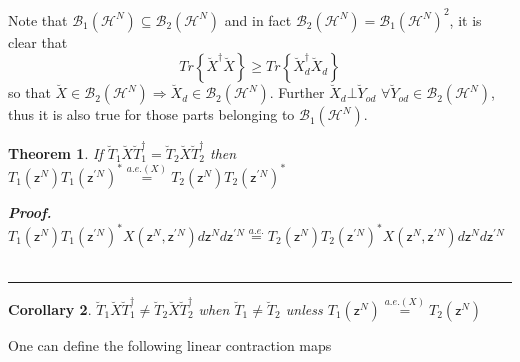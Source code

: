 \documentclass[aps,preprint]{revtex4}
\newtheorem{theorem}{Theorem}
\newtheorem{corollary}[theorem]{Corollary}
\newenvironment{proof}[1][Proof]{\noindent\textbf{#1.} }{\ \rule{0.5em}{0.5em}}
\begin{document}
Note that $\mathcal{B}_{1}\left( \mathcal{H}^{N}\right) \subseteq \mathcal{B}%
_{2}\left( \mathcal{H}^{N}\right) $ and in fact $\mathcal{B}_{2}\left( 
\mathcal{H}^{N}\right) =\mathcal{B}_{1}\left( \mathcal{H}^{N}\right) ^{2}$,
it is clear that 
\begin{equation}
Tr\left\{ \breve{X}^{\dagger }\breve{X}\right\} \geq Tr\left\{ \breve{X}%
_{d}^{\dagger }\breve{X}_{d}\right\}
\end{equation}%
so that $\breve{X}\in \mathcal{B}_{2}\left( \mathcal{H}^{N}\right)
\Rightarrow \breve{X}_{d}\in \mathcal{B}_{2}\left( \mathcal{H}^{N}\right) $.
Further $\breve{X}_{d}\bot \breve{Y}_{od}$ $\forall \breve{Y}_{od}\in 
\mathcal{B}_{2}\left( \mathcal{H}^{N}\right) $, thus it is also true for
those parts belonging to $\mathcal{B}_{1}\left( \mathcal{H}^{N}\right) $.

\begin{theorem}
If $\breve{T}_{1}\breve{X}\breve{T}_{1}^{\dagger }=\breve{T}_{2}\breve{X}%
\breve{T}_{2}^{\dagger }$ then $T_{1}\left( \mathsf{z}^{N}\right)
T_{1}\left( \mathsf{z}^{\prime N}\right) ^{\ast }\overset{a.e.\left(
X\right) }{=}T_{2}\left( \mathsf{z}^{N}\right) T_{2}\left( \mathsf{z}%
^{\prime N}\right) ^{\ast }$

\begin{proof}
$T_{1}\left( \mathsf{z}^{N}\right) T_{1}\left( \mathsf{z}^{\prime N}\right)
^{\ast }X\left( \mathsf{z}^{N},\mathsf{z}^{\prime N}\right) d\mathsf{z}^{N}d%
\mathsf{z}^{\prime N}\overset{a.e.}{=}T_{2}\left( \mathsf{z}^{N}\right)
T_{2}\left( \mathsf{z}^{\prime N}\right) ^{\ast }X\left( \mathsf{z}^{N},%
\mathsf{z}^{\prime N}\right) d\mathsf{z}^{N}d\mathsf{z}^{\prime N}$
\end{proof}
\end{theorem}

\begin{corollary}
$\breve{T}_{1}\breve{X}\breve{T}_{1}^{\dagger }\neq \breve{T}_{2}\breve{X}%
\breve{T}_{2}^{\dagger }$ when $\breve{T}_{1}\neq \breve{T}_{2}$ unless $%
T_{1}\left( \mathsf{z}^{N}\right) \overset{a.e.\left( X\right) }{=}%
T_{2}\left( \mathsf{z}^{N}\right) $
\end{corollary}

One can define the following linear contraction maps
\end{document}
